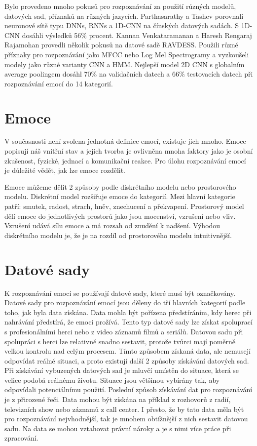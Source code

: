 \documentclass[FM,BP]{tulthesis}
\begin{document}
Bylo provedeno mnoho pokusů pro rozpoznávání za použití různých modelů, datových sad, příznaků na různých jazycích. Parthasarathy a
Tashev porovnali neuronové sítě typu DNNs, RNNs a 1D-CNN na čínských datových sadách. S 1D-CNN dosáhli výsledků 56\% procent. Kannan Venkataramanan a Haresh Rengaraj Rajamohan provedli několik pokusů na datové sadě RAVDESS. Použili různé příznaky pro rozpoznávání jako MFCC nebo Log Mel Spectrogramy a vyzkoušeli modely jako různé varianty CNN a HMM. Nejlepší model 2D CNN s globalním average poolingem dosáhl 70\% na validačních datech a 66\% testovacích datech při rozpoznávání emocí do 14 kategorií\cite{DBLP:journals/corr/abs-1912-10458}.

\section{Emoce}
V současnosti není zvolena jednotná definice emocí, existuje jich mnoho. Emoce popisují náš vnitřní stav a jejich tvorba je ovlivněna mnoha faktory jako je osobní zkušenost, fyzické, jednací a komunikační reakce. Pro úlohu rozpoznávání emocí je důležité vědět, jak lze emoce rozdělit\cite{DBLP:journals/speech/AkcayO20}.

Emoce můžeme dělit 2 způsoby podle diskrétního modelu nebo prostorového modelu. Diskrétní model rozšiřuje emoce do kategorií. Mezi hlavní kategorie patří: smutek, radost, strach, hněv, znechucení a překvapení. Prostorový model dělí emoce do jednotlivých prostorů jako jsou mocenství, vzrušení nebo vliv. Vzrušení udává sílu emoce a má rozsah od znudění k nadšení. Výhodou diskrétního modelu je, že je na rozdíl od prostorového modelu intuitivnější.\cite{DBLP:journals/speech/AkcayO20}

\section{Datové sady}
K rozpoznávání emocí se používají datové sady, které musí být označkovány. Datové sady pro rozpoznávání emocí jsou děleny do tří hlavních kategorií podle toho, jak byla data získána. Data mohla být pořízena předstíráním, kdy herec při nahrávání předstírá, že emoci prožívá. Tento typ datové sady lze získat spoluprací s profesionálními herci nebo z video záznamů filmů a seriálů. Datovou sadu při spolupráci s herci lze relativně snadno sestavit, protože tvůrci mají poměrně velkou kontrolu nad celým procesem. Tímto způsobem získaná data, ale nemusejí odpovídat reálné situaci, a proto existují další 2 způsoby získávání datových sad. Při získávání vybuzených datových sad je mluvčí umístěn do situace, která se velice podobá reálnému životu. Situace jsou většinou vybírány tak, aby odpovídali potenciálnímu použití\cite{konar_chakraborty_2015}. Poslední způsob získávání dat pro rozpoznávání je z přirozené řeči. Data mohou být získána na příklad z rozhovorů z radií, televizních show nebo záznamů z call center. I přesto, že by tato data měla být pro rozpoznávání nejvhodnější, tak je mnohem obtížnější z nich sestavit datovou sadu. Na data se mohou vztahovat právní nároky a je s nimi více práce při zpracování.\cite{DBLP:journals/speech/AkcayO20}
\end{document}
